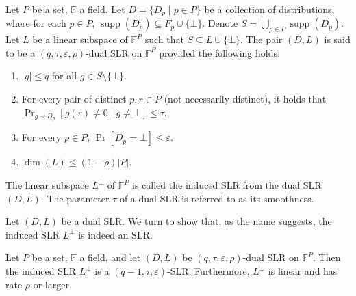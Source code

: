 \begin{ntdefinition}
Let $P$ be a set, $\mathbb F$ a field. Let $D=\{D_p\mid p\in P\}$ be a collection of distributions, where for each $p\in P$, $\operatorname{supp}(D_p)\subseteq F_p\cup\{\bot\}$. Denote $S=\bigcup_{p\in P}\operatorname{supp}(D_p)$. Let $L$ be a linear subspace of $\mathbb F^P$ such that $S\subseteq L\cup\{\bot\}$. The pair $(D,L)$ is said to be a $(q,\tau,\varepsilon,\rho)$-dual SLR on $\mathbb F^P$ provided the following holds:
\begin{enumerate}
\item $|g|\leq q$ for all $g\in S\setminus\{\bot\}$.
\item For every pair of distinct $p,r\in P$ (not necessarily distinct), it holds that $\Pr_{g\sim D_p}[g(r)\ne0\mid g\ne\bot]\leq\tau$.
\item For every $p\in P$, $\Pr[D_p=\bot]\leq\varepsilon$.
\item $\dim(L)\leq(1-\rho)|P|$.
\end{enumerate}
The linear subspace $L^\perp$ of $\mathbb F^P$ is called the induced SLR from the dual SLR $(D,L)$. The parameter $\tau$ of a dual-SLR is referred to as its smoothness.
\end{ntdefinition}
Let $(D,L)$ be a dual SLR. We turn to show that, as the name suggests, the induced SLR $L^\perp$ is indeed an SLR.
\begin{ntlemma}
Let $P$ be a set, $\mathbb F$ a field, and let $(D,L)$ be $(q,\tau,\varepsilon,\rho)$-dual SLR on $\mathbb F^P$. Then the induced SLR $L^\perp$ is a $(q-1,\tau,\varepsilon)$-SLR. Furthermore, $L^\perp$ is linear and has rate $\rho$ or larger.
\end{ntlemma}
